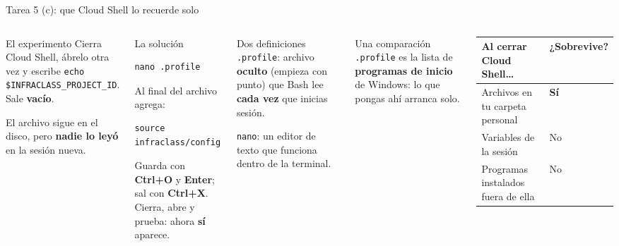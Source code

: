 \documentclass[aspectratio=169,10pt,c]{beamer}
\begin{document}
\begin{frame}[fragile]{Tarea 5 (c): que Cloud Shell lo recuerde solo}
\begin{columns}[T,onlytextwidth]
\begin{alertblock}{El experimento}
\small Cierra Cloud Shell, ábrelo otra vez y escribe \texttt{echo \$INFRACLASS\_PROJECT\_ID}. Sale \textbf{vacío}.\par\smallskip
El archivo sigue en el disco, pero \textbf{nadie lo leyó} en la sesión nueva.
\end{alertblock}
\begin{block}{La solución}
\begin{lstlisting}[basicstyle=\ttfamily\footnotesize]
nano .profile
\end{lstlisting}
\small Al final del archivo agrega:
\begin{lstlisting}[basicstyle=\ttfamily\footnotesize]
source infraclass/config
\end{lstlisting}
\small Guarda con \textbf{Ctrl+O} y \textbf{Enter}; sal con \textbf{Ctrl+X}. Cierra, abre y prueba: ahora \textbf{sí} aparece.
\end{block}
\begin{exampleblock}{Dos definiciones}
\small
\texttt{.profile}: archivo \textbf{oculto} (empieza con punto) que Bash lee \textbf{cada vez} que inicias sesión.\par\smallskip
\texttt{nano}: un editor de texto que funciona dentro de la terminal.
\end{exampleblock}
\begin{block}{Una comparación}
\small \texttt{.profile} es la lista de \textbf{programas de inicio} de Windows: lo que pongas ahí arranca solo.
\end{block}
\renewcommand{\arraystretch}{1.15}
\footnotesize
\begin{tabular}{@{}p{4.0cm}p{2.0cm}@{}}
\toprule
\textbf{Al cerrar Cloud Shell\ldots} & \textbf{¿Sobrevive?}\\
\midrule
Archivos en tu carpeta personal & \textbf{Sí}\\
Variables de la sesión & No\\
Programas instalados fuera de ella & No\\
\bottomrule
\end{tabular}
\end{columns}
\end{frame}
\end{document}
